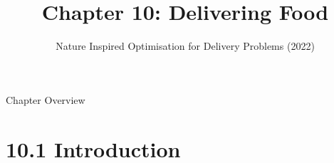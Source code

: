 \documentclass[aspectratio=169,10pt]{beamer}
\title[Ch.\,10: Delivering Food]{Chapter 10: Delivering Food}
\subtitle{Nature Inspired Optimisation for Delivery Problems (2022)}
\author{}
\date{}
\begin{document}

\begin{frame}
  \titlepage
\end{frame}

\begin{frame}{Chapter Overview}
  \tableofcontents
\end{frame}

\section{10.1 Introduction}
\end{document}

